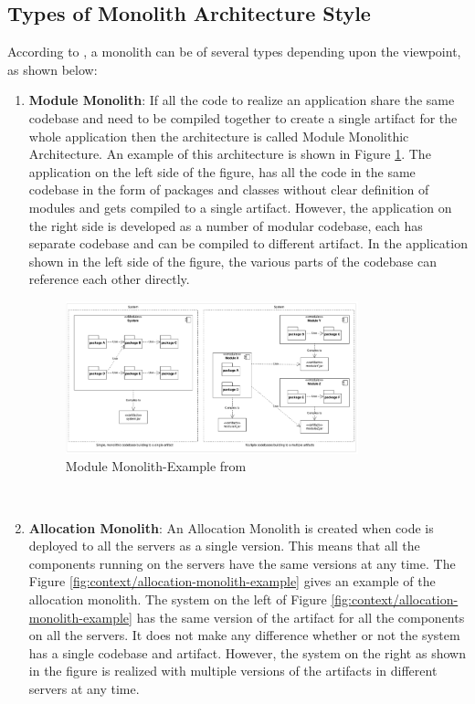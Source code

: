 \subsection{Types of Monolith Architecture Style}\label{subsection:context/monolith-types}
According to \cite{Annett:2014aa}, a monolith can be of several types depending upon the viewpoint, as shown below:
\begin{enumerate}
\item \textbf{Module Monolith}: If all the code to realize an application share the same codebase and need to be compiled together to create a single artifact for the whole application then the architecture is called Module Monolithic Architecture. An example of this architecture is shown in Figure \ref{fig:context/module-monolith-example}. The application on the left side of the figure, has all the code in the same codebase in the form of packages and classes without clear definition of modules and gets compiled to a single artifact. However, the application on the right side is developed as a number of modular codebase, each has separate codebase and can be compiled to different artifact. In the application shown in the left side of the figure, the various parts of the codebase can reference each other directly.

\begin{figure}[h!]
\begin{center}
\includegraphics[width=0.8\textwidth]{figures/context-module-monolith}
\caption{Module Monolith-Example from \cite{Annett:2014aa}}
\label{fig:context/module-monolith-example}
\end{center}
\end{figure}

\\
\item \textbf{Allocation Monolith}: An Allocation Monolith is created when code is deployed to all the servers as a single version. This means that all the components running on the servers have the same versions at any time. The Figure \ref{fig:context/allocation-monolith-example} gives an example of the allocation monolith. The system on the left of Figure \ref{fig:context/allocation-monolith-example} has the same version of the artifact for all the components on all the servers. It does not make any difference whether or not the system has a single codebase and artifact. However, the system on the right as shown in the figure is realized with multiple versions of the artifacts in different servers at any time.


\end{enumerate}
